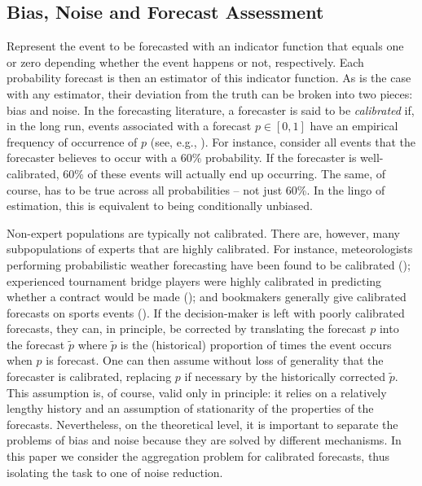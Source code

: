 \documentclass[11pt]{article}
\theoremstyle{definition}
\theoremstyle{definition}
\def\pt{\tilde{p}}
\begin{document}
\subsection{Bias, Noise and Forecast Assessment}
\label{BiasNoise}
Represent the event to be forecasted with an indicator function that equals one or zero depending whether the event happens or not, respectively. Each probability forecast is then an estimator of this indicator function.  As is
the case with any estimator, their deviation from the truth
can be broken into two pieces: bias and noise.  In the forecasting literature, a forecaster
 is said to be {\em calibrated}
if, in the long run, events associated with a forecast $p \in [0,1]$ have an empirical frequency of occurrence of $p$ (see, e.g., \citealt{degroot1983comparison}). For instance, consider all events that the forecaster believes to occur with a 60\% probability. If the forecaster is well-calibrated, 60\% of these events will actually end up occurring. The same, of course, has to be true across all probabilities -- not just 60\%. 
In the lingo of estimation, this is equivalent to being conditionally 
unbiased.  

Non-expert populations are typically not calibrated. There are, however, many subpopulations of experts that are highly calibrated. For instance, meteorologists performing probabilistic weather forecasting have been found to be calibrated (\citealt{murphy1977reliability}); experienced tournament bridge players were highly calibrated in predicting whether a contract would be made (\citealt{keren1987facing}); and bookmakers generally give calibrated forecasts on sports events (\citealt{dowie1976efficiency, yates1985conditional}). If the decision-maker is left with poorly calibrated forecasts, they can, in principle, be corrected by translating the forecast $p$ into the forecast $\pt$
where $\pt$ is the (historical) proportion of times the 
event occurs when $p$ is forecast.  One can then assume without
loss of generality that the forecaster is calibrated, replacing
$p$ if necessary by the historically corrected $\pt$. This assumption is, of course, valid only in principle: 
it relies on a relatively lengthy history and an assumption
of stationarity of the properties of the forecasts.
 Nevertheless,
on the theoretical level, it is important to separate the problems 
of bias and noise because they are solved by different mechanisms.
In this paper we consider the aggregation problem for calibrated forecasts, thus isolating the task to one of noise reduction. 
\end{document}
